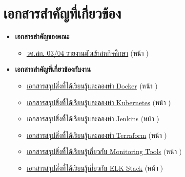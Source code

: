 \chapter{เอกสารสำคัญที่เกี่ยวข้อง}
\begin{itemize}
    \item \textbf{เอกสารสำคัญของคณะ}
    \begin{itemize}
        \item \hyperlink{target:03-04}{วศ.สก.-03/04 รายงานตัวเข้าสหกิจศึกษา} (หน้า \pageref{page:03-04})
    \end{itemize}
    \item \textbf{เอกสารสำคัญที่เกี่ยวข้องกับงาน}
    \begin{itemize}
        \item \hyperlink{target:docker}{เอกสารสรุปสิ่งที่ได้เรียนรู้และลองทำ Docker} (หน้า \pageref{page:docker})
        \item \hyperlink{target:kube}{เอกสารสรุปสิ่งที่ได้เรียนรู้และลองทำ Kubernetes} (หน้า \pageref{page:kube})
        \item \hyperlink{target:jenkins}{เอกสารสรุปสิ่งที่ได้เรียนรู้และลองทำ Jenkins} (หน้า \pageref{page:jenkins})
        \item \hyperlink{target:terraform}{เอกสารสรุปสิ่งที่ได้เรียนรู้และลองทำ Terraform} (หน้า \pageref{page:terraform})
        \item \hyperlink{target:monitoring}{เอกสารสรุปสิ่งที่ได้เรียนรู้เกี่ยวกับ Monitoring Tools} (หน้า \pageref{page:monitoring})
        \item \hyperlink{target:elk}{เอกสารสรุปสิ่งที่ได้เรียนรู้เกี่ยวกับ ELK Stack} (หน้า \pageref{page:elk})
    \end{itemize}
\end{itemize}








